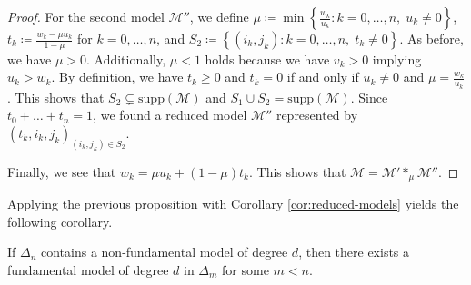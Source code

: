 \begin{proof}
    For the second model \( \mathcal{M}'' \), we define \( \mu \coloneqq \min \left\{ \frac{w_k}{u_k} : k = 0, \dots, n, \; u_k \neq 0 \right\} \), \( t_k \coloneqq \frac{w_k - \mu u_k}{1 - \mu} \) for \(  k = 0, \dots, n \), and \( S_2 \coloneqq \left\{ (i_k, j_k) : k=0, \dots, n, \; t_k \neq 0 \right\} \).
    As before, we have \( \mu > 0 \). Additionally, \( \mu < 1 \) holds because we have \( v_k > 0 \) implying \( u_k > w_k \). By definition, we have \( t_k \geq 0 \) and \( t_k = 0 \) if and only if \( u_k \neq 0 \) and \( \mu = \frac{w_k}{u_k} \). This shows that \( S_2 \subsetneq  \mathrm{supp}(\mathcal{M}) \) and \( S_1 \cup S_2 = \mathrm{supp}(\mathcal{M}) \). Since \( t_0 + \dots + t_n = 1 \), we found a reduced model \( \mathcal{M}'' \) represented by \( (t_k, i_k, j_k)_{(i_k,j_k) \in S_2} \).

    Finally, we see that \( w_k = \mu u_k + (1-\mu) t_k\). This shows that \( \mathcal{M} = \mathcal{M}' *_\mu \mathcal{M}'' \).
\end{proof}

Applying the previous proposition with Corollary \ref{cor:reduced-models} yields the following corollary.

\begin{corollary}\label{cor:fundamental-models-ksmlkdf}
    If \( \Delta_n \) contains a non-fundamental model of degree \( d \), then there exists a fundamental model of degree \( d \) in \( \Delta_m \) for some \( m < n \).
\end{corollary}

